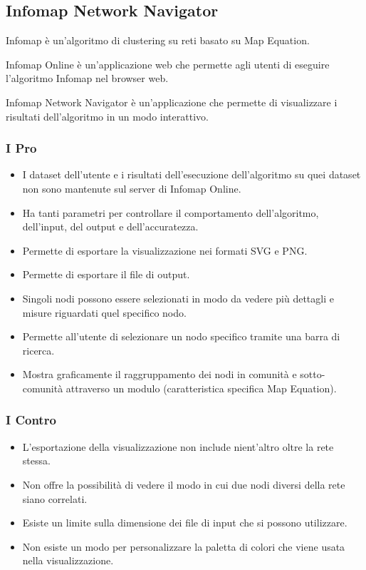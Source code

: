 \documentclass[a4paper,12pt]{report}
\begin{document}
		\subsection{Infomap Network Navigator}
		Infomap è un'algoritmo di clustering su reti basato su Map Equation. 
		
		Infomap Online è un'applicazione web che permette agli utenti di eseguire l'algoritmo Infomap nel browser web. \cite{mapequationsite} 
		
		Infomap Network Navigator è un'applicazione che permette di visualizzare i risultati
		dell'algoritmo in un modo interattivo. \cite{mapequationnavigatorsite} 
		
			\subsubsection*{I Pro}
				\begin{itemize}
					\item I dataset dell'utente e i risultati dell'esecuzione dell'algoritmo su quei dataset non sono mantenute sul server di Infomap Online.
					\item Ha tanti parametri per controllare il comportamento dell'algoritmo, dell'input, del output e dell'accuratezza.
					\item Permette di esportare la visualizzazione nei formati SVG e PNG.
					\item Permette di esportare il file di output.
					\item Singoli nodi possono essere selezionati in modo da vedere più dettagli e misure riguardati quel specifico nodo.
					\item Permette all'utente di selezionare un nodo specifico tramite una barra di ricerca.
					\item Mostra graficamente il raggruppamento dei nodi in comunità e sotto-comunità attraverso un modulo (caratteristica specifica Map Equation).
				\end{itemize}			

			\subsubsection*{I Contro}
				\begin{itemize}
					\item L'esportazione della visualizzazione non include nient'altro oltre la rete stessa.
					\item Non offre la possibilità di vedere il modo in cui due nodi diversi della rete siano correlati.
					\item Esiste un limite sulla dimensione dei file di input che si possono utilizzare.
					\item Non esiste un modo per personalizzare la paletta di colori che viene usata nella visualizzazione.
				\end{itemize}
\end{document}
